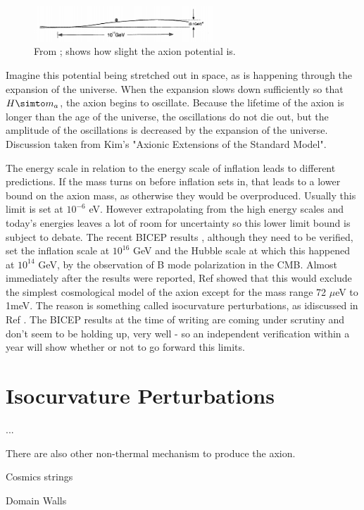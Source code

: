 \documentclass[12pt,twosides]{book}
\begin{document}
\begin{figure}
\includegraphics[width=0.6\textwidth]{axionpotential}
\caption{From \cite{kim95}; shows how slight the axion potential is.}
\end{figure}

Imagine this potential being stretched out in space, as is happening through the expansion of the universe. When the expansion slows down sufficiently so that $H \simto m_a$, the axion begins to oscillate. Because the lifetime of the axion is longer than the age of the universe, the oscillations do not die out, but the amplitude of the oscillations is decreased by the expansion of the universe. Discussion taken from Kim's "Axionic Extensions of the Standard Model".

The energy scale in relation to the energy scale of inflation leads to different predictions. If the mass turns on before inflation sets in, that leads to a lower bound on the axion mass, as otherwise they would be overproduced. Usually this limit is set at $10^{-6}$ eV. However extrapolating from the high energy scales and today's energies leaves a lot of room for uncertainty so this lower limit bound is subject to debate. The recent BICEP results \cite{bicep14}, although they need to be verified, set the inflation scale at $10^16$ GeV and the Hubble scale at which this happened at $10^14$ GeV, by the observation of B mode polarization in the CMB. Almost immediately after the results were reported, Ref \cite{visinelli14} showed that this would exclude the simplest cosmological model of the axion except for the mass range 72 $\mu$eV to 1meV. The reason is something called isocurvature perturbations, as idiscussed in Ref \cite{fox04}. The BICEP results at the time of writing are coming under scrutiny and don't seem to be holding up, very well - so an independent verification within a year will show whether or not to go forward this limits.

\section{Isocurvature Perturbations}

...

There are also other non-thermal mechanism to produce the axion. 
\begin{description}
\item Cosmics strings

\item Domain Walls

\end{description}
\end{document}

